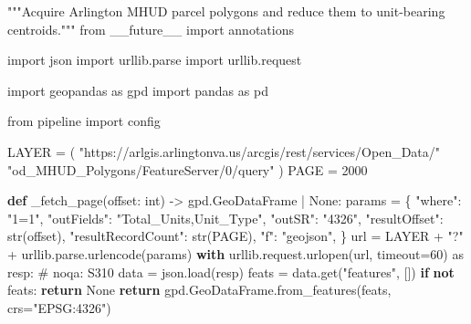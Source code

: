 \documentclass[
  letterpaper,
  DIV=11,
  numbers=noendperiod]{scrreprt}
\newenvironment{Shaded}{\begin{snugshade}}{\end{snugshade}}
\newcommand{\BuiltInTok}[1]{\textcolor[rgb]{0.00,0.23,0.31}{#1}}
\newcommand{\CommentTok}[1]{\textcolor[rgb]{0.37,0.37,0.37}{#1}}
\newcommand{\ControlFlowTok}[1]{\textcolor[rgb]{0.00,0.23,0.31}{\textbf{#1}}}
\newcommand{\DecValTok}[1]{\textcolor[rgb]{0.68,0.00,0.00}{#1}}
\newcommand{\ImportTok}[1]{\textcolor[rgb]{0.00,0.46,0.62}{#1}}
\newcommand{\KeywordTok}[1]{\textcolor[rgb]{0.00,0.23,0.31}{\textbf{#1}}}
\newcommand{\NormalTok}[1]{\textcolor[rgb]{0.00,0.23,0.31}{#1}}
\newcommand{\OperatorTok}[1]{\textcolor[rgb]{0.37,0.37,0.37}{#1}}
\newcommand{\StringTok}[1]{\textcolor[rgb]{0.13,0.47,0.30}{#1}}
\newcommand{\VariableTok}[1]{\textcolor[rgb]{0.07,0.07,0.07}{#1}}
\begin{document}
\begin{Shaded}
\begin{Highlighting}[]
\CommentTok{"""Acquire Arlington MHUD parcel polygons and reduce them to unit{-}bearing centroids."""}
\ImportTok{from}\NormalTok{ \_\_future\_\_ }\ImportTok{import}\NormalTok{ annotations}

\ImportTok{import}\NormalTok{ json}
\ImportTok{import}\NormalTok{ urllib.parse}
\ImportTok{import}\NormalTok{ urllib.request}

\ImportTok{import}\NormalTok{ geopandas }\ImportTok{as}\NormalTok{ gpd}
\ImportTok{import}\NormalTok{ pandas }\ImportTok{as}\NormalTok{ pd}

\ImportTok{from}\NormalTok{ pipeline }\ImportTok{import}\NormalTok{ config}

\NormalTok{LAYER }\OperatorTok{=}\NormalTok{ (}
    \StringTok{"https://arlgis.arlingtonva.us/arcgis/rest/services/Open\_Data/"}
    \StringTok{"od\_MHUD\_Polygons/FeatureServer/0/query"}
\NormalTok{)}
\NormalTok{PAGE }\OperatorTok{=} \DecValTok{2000}


\KeywordTok{def}\NormalTok{ \_fetch\_page(offset: }\BuiltInTok{int}\NormalTok{) }\OperatorTok{{-}\textgreater{}}\NormalTok{ gpd.GeoDataFrame }\OperatorTok{|} \VariableTok{None}\NormalTok{:}
\NormalTok{    params }\OperatorTok{=}\NormalTok{ \{}
        \StringTok{"where"}\NormalTok{: }\StringTok{"1=1"}\NormalTok{,}
        \StringTok{"outFields"}\NormalTok{: }\StringTok{"Total\_Units,Unit\_Type"}\NormalTok{,}
        \StringTok{"outSR"}\NormalTok{: }\StringTok{"4326"}\NormalTok{,}
        \StringTok{"resultOffset"}\NormalTok{: }\BuiltInTok{str}\NormalTok{(offset),}
        \StringTok{"resultRecordCount"}\NormalTok{: }\BuiltInTok{str}\NormalTok{(PAGE),}
        \StringTok{"f"}\NormalTok{: }\StringTok{"geojson"}\NormalTok{,}
\NormalTok{    \}}
\NormalTok{    url }\OperatorTok{=}\NormalTok{ LAYER }\OperatorTok{+} \StringTok{"?"} \OperatorTok{+}\NormalTok{ urllib.parse.urlencode(params)}
    \ControlFlowTok{with}\NormalTok{ urllib.request.urlopen(url, timeout}\OperatorTok{=}\DecValTok{60}\NormalTok{) }\ImportTok{as}\NormalTok{ resp:  }\CommentTok{\# noqa: S310}
\NormalTok{        data }\OperatorTok{=}\NormalTok{ json.load(resp)}
\NormalTok{    feats }\OperatorTok{=}\NormalTok{ data.get(}\StringTok{"features"}\NormalTok{, [])}
    \ControlFlowTok{if} \KeywordTok{not}\NormalTok{ feats:}
        \ControlFlowTok{return} \VariableTok{None}
    \ControlFlowTok{return}\NormalTok{ gpd.GeoDataFrame.from\_features(feats, crs}\OperatorTok{=}\StringTok{"EPSG:4326"}\NormalTok{)}



\end{Highlighting}
\end{Shaded}
\end{document}
